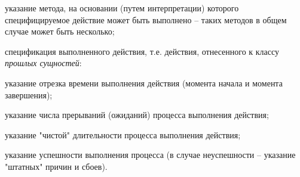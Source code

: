 \begin{SCn}
{\begin{scnitemize}
\begin{scnitemizeii}
\end{scnitemizeii}
\item указание метода, на основании (путем интерпретации) которого специфицируемое действие может быть выполнено -- таких методов в общем случае может быть несколько;
\item спецификация выполненного действия, т.е. действия, отнесенного к классу \textit{прошлых сущностей}:
\begin{scnitemizeii}
\item указание отрезка времени выполнения действия (момента начала и момента завершения);
\item указание числа прерываний (ожиданий) процесса выполнения действия;
\item указание "чистой"{} длительности процесса выполнения действия;
\item указание успешности выполнения процесса (в случае неуспешности -- указание "штатных"{} причин и сбоев).
\end{scnitemizeii}
\end{scnitemize}}




\bigskip
{}


\end{SCn}
